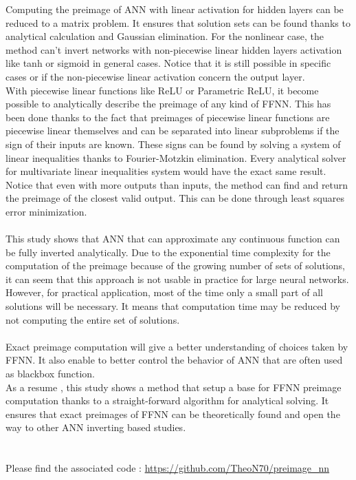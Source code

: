 \documentclass{article}
\begin{document}
Computing the preimage of ANN with linear activation for hidden layers can be reduced to a matrix problem. 
It ensures that solution sets can be found thanks to analytical calculation and Gaussian elimination. 
For the nonlinear case, the method can’t invert networks with non-piecewise linear hidden layers activation like tanh or sigmoid in general cases. 
Notice that it is still possible in specific cases or if the non-piecewise linear activation concern the output layer.\\ 
With piecewise linear functions like ReLU or Parametric ReLU, it become possible to analytically describe the preimage of
any kind of FFNN. This has been done thanks to the fact that preimages of piecewise linear functions are piecewise linear themselves and can
be separated into linear subproblems if the sign of their inputs are known. These signs can be found by solving a system of linear 
inequalities thanks to Fourier-Motzkin elimination. Every analytical solver for multivariate linear inequalities system would 
have the exact same result.\\ Notice that even with more outputs than inputs, the method can find and return the preimage of the closest valid output. 
This can be done through least squares error minimization.\\\\
This study shows that ANN that can approximate any continuous function can be fully inverted analytically. 
Due to the exponential time complexity for the computation of the preimage because of the growing number of sets of solutions, 
it can seem that this approach is not usable in practice for large neural networks. However, for practical application, most of the time only a
small part of all solutions will be necessary. It means that computation time may be reduced by not computing the entire set of solutions. \\\\
Exact preimage computation will give a better understanding of choices taken by FFNN. It also enable to better control 
the behavior of ANN that are often used as blackbox function.\\ As a resume , this study shows a method that setup a base for FFNN preimage 
computation thanks to a straight-forward algorithm for analytical solving. It ensures that exact preimages of FFNN can be theoretically 
found and open the way to other ANN inverting based studies.
\\\\\\
Please find the associated code : \url{https://github.com/TheoN70/preimage_nn}
\end{document}
